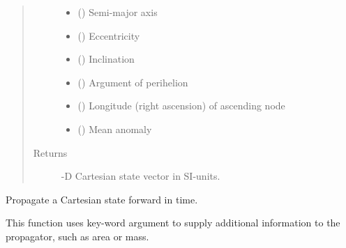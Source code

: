 \documentclass[letterpaper,10pt,english]{sphinxmanual}
\begin{document}
\begin{fulllineitems}
\begin{fulllineitems}
\begin{quote}
\begin{description}
\begin{itemize}
\item {} 
 () \textendash{} Semi-major axis

\item {} 
 () \textendash{} Eccentricity

\item {} 
 () \textendash{} Inclination

\item {} 
 () \textendash{} Argument of perihelion

\item {} 
 () \textendash{} Longitude (right ascension) of ascending node

\item {} 
 () \textendash{} Mean anomaly

\end{itemize}

\item[{Returns}] -D Cartesian state vector in SI-units.

\end{description}\end{quote}

\end{fulllineitems}


\begin{fulllineitems}
\label{\detokenize{modules/propagator_base:propagator_base.PropagatorBase.get_orbit_cart}}
Propagate a Cartesian state forward in time.

This function uses key-word argument to supply additional information to the propagator, such as area or mass.


\end{fulllineitems}
\end{fulllineitems}
\end{document}
